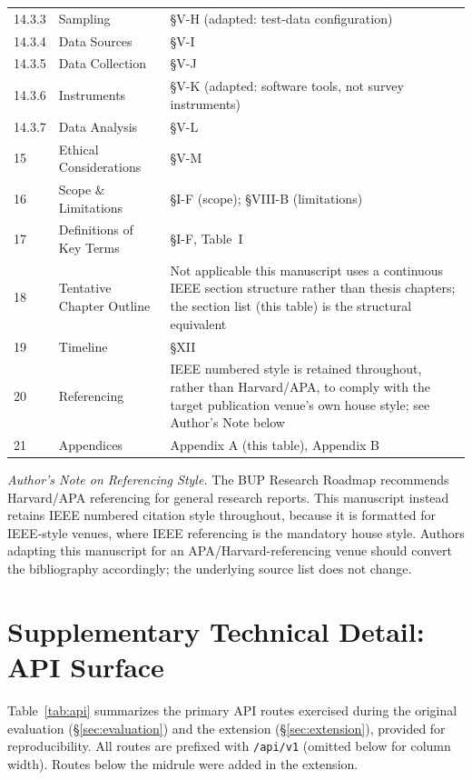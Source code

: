 \documentclass[conference]{IEEEtran}
\begin{document}
\begin{table}[h]
\begin{tabular}{@{}p{0.4cm}p{2.3cm}p{4.9cm}@{}}
14.3.3 & Sampling & \S V-H (adapted: test-data configuration) \\
14.3.4 & Data Sources & \S V-I \\
14.3.5 & Data Collection & \S V-J \\
14.3.6 & Instruments & \S V-K (adapted: software tools, not survey instruments) \\
14.3.7 & Data Analysis & \S V-L \\
15 & Ethical Considerations & \S V-M \\
16 & Scope \& Limitations & \S I-F (scope); \S VIII-B (limitations) \\
17 & Definitions of Key Terms & \S I-F, Table~I \\
18 & Tentative Chapter Outline & Not applicable \textemdash{} this manuscript uses a continuous IEEE section structure rather than thesis chapters; the section list (this table) is the structural equivalent \\
19 & Timeline & \S XII \\
20 & Referencing & IEEE numbered style is retained throughout, rather than Harvard/APA, to comply with the target publication venue's own house style; see Author's Note below \\
21 & Appendices & Appendix A (this table), Appendix B \\
\bottomrule
\end{tabular}
\end{table}

\textit{Author's Note on Referencing Style.} The BUP Research Roadmap recommends Harvard/APA referencing for general research reports. This manuscript instead retains IEEE numbered citation style throughout, because it is formatted for IEEE-style venues, where IEEE referencing is the mandatory house style. Authors adapting this manuscript for an APA/Harvard-referencing venue should convert the bibliography accordingly; the underlying source list does not change.

\section{Supplementary Technical Detail: API Surface}
\label{app:api}
Table~\ref{tab:api} summarizes the primary API routes exercised during the original evaluation (\S\ref{sec:evaluation}) and the extension (\S\ref{sec:extension}), provided for reproducibility. All routes are prefixed with \texttt{/api/v1} (omitted below for column width). Routes below the midrule were added in the extension.
\end{document}
